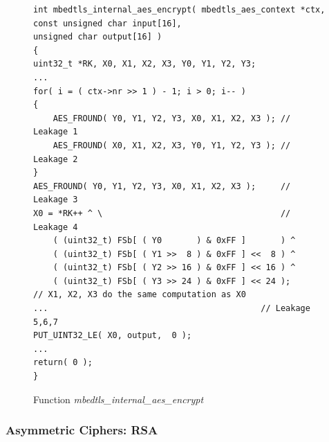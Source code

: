 \begin{figure}%
    \centering
    \begin{lstlisting}[xleftmargin=.02\textwidth,xrightmargin=.01\textwidth]
int mbedtls_internal_aes_encrypt( mbedtls_aes_context *ctx,
const unsigned char input[16],
unsigned char output[16] )
{
uint32_t *RK, X0, X1, X2, X3, Y0, Y1, Y2, Y3;
...
for( i = ( ctx->nr >> 1 ) - 1; i > 0; i-- )
{
    AES_FROUND( Y0, Y1, Y2, Y3, X0, X1, X2, X3 ); // Leakage 1
    AES_FROUND( X0, X1, X2, X3, Y0, Y1, Y2, Y3 ); // Leakage 2
}
AES_FROUND( Y0, Y1, Y2, Y3, X0, X1, X2, X3 );     // Leakage 3
X0 = *RK++ ^ \                                    // Leakage 4
    ( (uint32_t) FSb[ ( Y0       ) & 0xFF ]       ) ^
    ( (uint32_t) FSb[ ( Y1 >>  8 ) & 0xFF ] <<  8 ) ^
    ( (uint32_t) FSb[ ( Y2 >> 16 ) & 0xFF ] << 16 ) ^
    ( (uint32_t) FSb[ ( Y3 >> 24 ) & 0xFF ] << 24 );
// X1, X2, X3 do the same computation as X0
...                                           // Leakage 5,6,7
PUT_UINT32_LE( X0, output,  0 );
...
return( 0 );
}
\end{lstlisting}
    \caption{Function \textit{mbedtls\_internal\_aes\_encrypt}}
    \label{mbedtls_aes}
\end{figure}

\subsubsection{Asymmetric Ciphers: RSA}\label{eval:asym}

